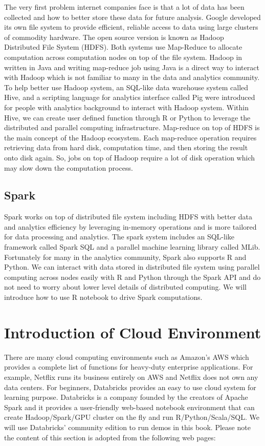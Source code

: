 \documentclass[]{book}
\theoremstyle{definition}
\theoremstyle{definition}
\theoremstyle{remark}
\begin{document}
The very first problem internet companies face is that a lot of data has
been collected and how to better store these data for future analysis.
Google developed its own file system to provide efficient, reliable
access to data using large clusters of commodity hardware. The open
source version is known as Hadoop Distributed File System (HDFS). Both
systems use Map-Reduce to allocate computation across computation nodes
on top of the file system. Hadoop in written in Java and writing
map-reduce job using Java is a direct way to interact with Hadoop which
is not familiar to many in the data and analytics community. To help
better use Hadoop system, an SQL-like data warehouse system called Hive,
and a scripting language for analytics interface called Pig were
introduced for people with analytics background to interact with Hadoop
system. Within Hive, we can create user defined function through R or
Python to leverage the distributed and parallel computing
infrastructure. Map-reduce on top of HDFS is the main concept of the
Hadoop ecosystem. Each map-reduce operation requires retrieving data
from hard disk, computation time, and then storing the result onto disk
again. So, jobs on top of Hadoop require a lot of disk operation which
may slow down the computation process.

\subsection{Spark}\label{spark}

Spark works on top of distributed file system including HDFS with better
data and analytics efficiency by leveraging in-memory operations and is
more tailored for data processing and analytics. The spark system
includes an SQL-like framework called Spark SQL and a parallel machine
learning library called MLib. Fortunately for many in the analytics
community, Spark also supports R and Python. We can interact with data
stored in distributed file system using parallel computing across nodes
easily with R and Python through the Spark API and do not need to worry
about lower level details of distributed computing. We will introduce
how to use R notebook to drive Spark computations.

\section{Introduction of Cloud
Environment}\label{introduction-of-cloud-environment}

There are many cloud computing environments such as Amazon's AWS which
provides a complete list of functions for heavy-duty enterprise
applications. For example, Netflix runs its business entirely on AWS and
Netflix does not own any data centers. For beginners, Databricks
provides an easy to use cloud system for learning purpose. Databricks is
a company founded by the creators of Apache Spark and it provides a
user-friendly web-based notebook environment that can create
Hadoop/Spark/GPU cluster on the fly and run R/Python/Scala/SQL. We will
use Databricks' community edition to run demos in this book. Please note
the content of this section is adopted from the following web pages:
\end{document}
